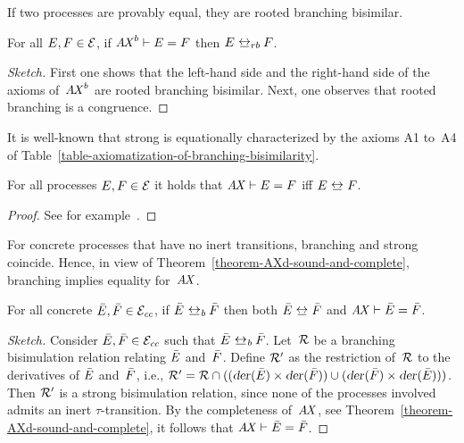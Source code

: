 \noindent
If two processes are provably equal, they are rooted branching
bisimilar.

\begin{lemma} [Soundness]
  \label{lemma-soundness-base}
  For all $E,F \in \mathcal{E}$, if $\mathit{A \mkern-2mu X}^b \vdash E = F$ then $E
  \rootedbrbisim F$.
\end{lemma}

\begin{proof}[Sketch]
  First one shows that the left-hand side and the right-hand
  side of the axioms of~$\mathit{A \mkern-2mu X}^b$ are rooted branching bisimilar.
  Next, one observes that rooted branching {\bisimilarity} is a
  congruence.
\end{proof}


\noindent
It is well-known that strong {\bisimilarity} is equationally
characterized by the axioms A1 to~A4 of
Table~\ref{table-axiomatization-of-branching-bisimilarity}.

\begin{theorem}
  \label{theorem-AXd-sound-and-complete}
  For all processes $E, F \in \mathcal{E}$ it holds that $\mathit{A \mkern-2mu X} \vdash E =
  F$ iff $E \bisim F$.
\end{theorem}

\begin{proof}
  See for example~\cite[Section~7.4]{Mil89:phi}.
\end{proof}

\noindent
For concrete processes that have no inert transitions, branching
{\bisimilarity} and strong {\bisimilarity} coincide. Hence, in view of
Theorem~\ref{theorem-AXd-sound-and-complete}, branching {\bisimilarity}
implies equality for~$\mathit{A \mkern-2mu X}$.

\begin{lemma}
  \label{lemma-branching-implies-equal-for-concrete-processes}
  For all concrete $\bar{E},\bar{F} \in \mathcal{E}_{\mathit{cc}}$, if $\Ebar \brbisim
  \Fbar$ then both $\Ebar \bisim \Fbar$ and $\mathit{A \mkern-2mu X} \vdash \bar{E} = \bar{F}$.
\end{lemma}

\begin{proof}[Sketch]
  Consider $\bar{E}, \bar{F} \in \mathcal{E}_{\mathit{cc}}$ such that $\Ebar \brbisim
  \Fbar$. Let~$\mathcal{R}$ be a branching bisimulation relation relating
  $\bar{E}$ and~$\bar{F}$. Define $\mathcal{R}'$ as the restriction of~$\mathcal{R}$
  to the derivatives of $\bar{E}$ and~$\bar{F}$, i.e., $\mathcal{R}' = \mathcal{R}
  \cap ( (\textsl{der} \mkern1mu(\bar{E}) \times \textsl{der} \mkern1mu(\bar{F})) \cup (\textsl{der} \mkern1mu(\bar{F}) \times
  \textsl{der} \mkern1mu(\bar{E})) )$. Then $\mathcal{R}'$ is a strong bisimulation relation,
  since none of the processes involved admits an inert
  $\tau$-transition. By the completeness of~$\mathit{A \mkern-2mu X}$, see
  Theorem~\ref{theorem-AXd-sound-and-complete}, it follows that $\mathit{A \mkern-2mu X}
  \vdash \bar{E} = \bar{F}$.
\end{proof}

